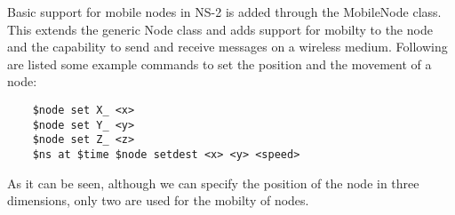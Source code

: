 
Basic support for mobile nodes in NS-2 is added through the MobileNode class. This extends
the generic Node class and adds support for mobilty to the node and the capability to
send and receive messages on a wireless medium. 
Following are listed some example commands to set the position and the movement of a node:
\lstset{numbers=none,captionpos=b,frame=single,language=C,caption=Commands to set the position and movement of a node,label=lst:saddrule}
\begin{lstlisting}
	$node set X_ <x>
	$node set Y_ <y>
	$node set Z_ <z>
	$ns at $time $node setdest <x> <y> <speed>
\end{lstlisting}
As it can be seen, although we can specify the position of the node in three dimensions,
only two are used for the mobilty of nodes.


